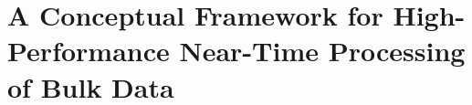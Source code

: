 \chapter{A Conceptual Framework for High-Performance Near-Time Processing of Bulk Data}\label{ch:conceptual_framework}
